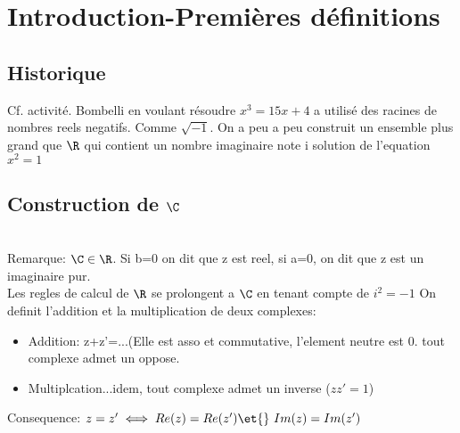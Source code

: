 \documentclass[a4paper]{article}
\begin{document}


\section{Introduction-Premi\`eres d\'efinitions}
\label{sec:para1}

\subsection{Historique}
\label{sec:histo}
Cf. activit\'e. Bombelli en voulant r\'esoudre $x^3=15x+4$ a utilis\'e
des racines de nombres reels negatifs. Comme $\sqrt{-1}$. On a peu a
peu construit un ensemble plus grand que $\R$ qui contient un nombre
imaginaire note i solution de l'equation $x^2=1$

\subsection{Construction de $\C$}
\label{sec:cons}
\\
Remarque: $\C \in \R$. Si b=0 on dit que z est reel, si a=0, on dit
que z est un imaginaire pur.\\
Les regles de calcul de $\R$ se prolongent a
$\C$ en tenant compte de $i^2=-1$
On definit l'addition et la multiplication de deux complexes:
\begin{itemize}
\item Addition: z+z'=...(Elle est asso et commutative, l'element
  neutre est 0. tout complexe admet un oppose.
\item Multiplcation...idem, tout complexe admet un inverse ($zz'=1$)
\end{itemize}

Consequence: $z=z' \iff Re(z)=Re(z') \et{}\ Im(z)=Im(z')$
\end{document}
